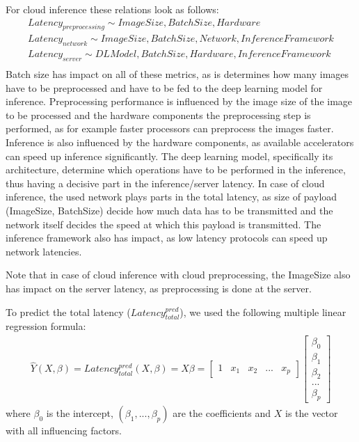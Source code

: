 For cloud inference these relations look as follows:
\begin{equation*}
\begin{gathered}
 Latency_{preprocessing}\sim ImageSize, BatchSize, Hardware\\
 Latency_{network}\sim ImageSize, BatchSize, Network, Inference Framework\\
 Latency_{server} \sim DLModel, BatchSize, Hardware, Inference Framework\\
\end{gathered}
\end{equation*}
Batch size has impact on all of these metrics, as is determines how many images have to be preprocessed and have to be fed to the deep learning model for inference.
Preprocessing performance is influenced by the image size of the image to be processed and the hardware components the preprocessing step is performed, as for example faster processors can preprocess the images faster.
Inference is also influenced by the hardware components, as available accelerators can speed up inference significantly. 
The deep learning model, specifically its architecture, determine which operations have to be performed in the inference, thus having a decisive part in the inference/server latency.
In case of cloud inference, the used network plays parts in the total latency, as size of payload (ImageSize, BatchSize) decide how much data has to be transmitted and the network itself decides the speed at which this payload is transmitted. The inference framework also has impact, as low latency protocols can speed up network latencies.

Note that in case of cloud inference with cloud preprocessing, the ImageSize also has impact on the server latency, as preprocessing is done at the server.


To predict the total latency ($Latency_{total}^{pred}$), we used the following multiple linear regression formula:
\begin{equation} \label{eq:regression}
\begin{gathered}
\hat{Y}(X,\beta) = Latency_{total}^{pred}(X,\beta) = X \beta = \begin{bmatrix} 1 &x_{1} & x_{2}& ...& x_{p} \end{bmatrix} \begin{bmatrix}
           \beta_{0} \\
           \beta_{1} \\
           \beta_{2} \\
           ... \\
           \beta_{p}
         \end{bmatrix} 
\end{gathered}
\end{equation}
where $\beta_0$ is the intercept, $(\beta_1,...,\beta_p)$ are the coefficients and $X$ is the vector with all influencing factors.

